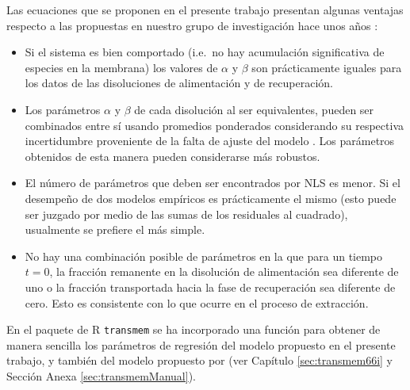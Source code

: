 Las ecuaciones que se proponen en el presente trabajo presentan algunas ventajas respecto a las propuestas en nuestro grupo de investigación hace unos años \citep{RODRIGUEZDESANMIGUEL2014}:
\begin{itemize}
    \item Si el sistema es bien comportado (i.e.\ no hay acumulación significativa de especies en la membrana) los valores de $\alpha$ y $\beta$ son prácticamente iguales para los datos de las disoluciones de alimentación y de recuperación.
    \item Los parámetros $\alpha$ y $\beta$ de cada disolución al ser equivalentes, pueden ser combinados entre sí usando promedios ponderados considerando su respectiva incertidumbre proveniente de la falta de ajuste del modelo \citep{borenstein2011}. Los parámetros obtenidos de esta manera pueden considerarse más robustos.
    \item El número de parámetros que deben ser encontrados por \ac{NLS} es menor. Si el desempeño de dos modelos empíricos es prácticamente el mismo (esto puede ser juzgado por medio de las sumas de los residuales al cuadrado), usualmente se prefiere el más simple.
    \item No hay una combinación posible de parámetros en la que para un tiempo $t=0$, la fracción remanente en la disolución de alimentación sea diferente de uno o la fracción transportada hacia la fase de recuperación sea diferente de cero. Esto es consistente con lo que ocurre en el proceso de extracción.
\end{itemize}   



En el paquete de R \verb|transmem| se ha incorporado una función para obtener de manera sencilla los parámetros de regresión del modelo propuesto en el presente trabajo, y también del modelo propuesto por \citet{RODRIGUEZDESANMIGUEL2014} (ver Capítulo \ref{sec:transmem66i} y Sección Anexa \ref{sec:transmemManual}).


